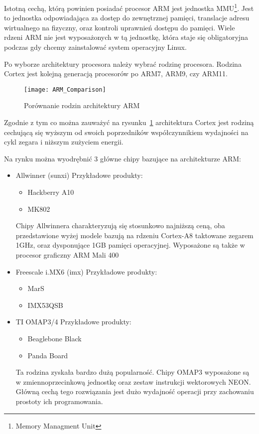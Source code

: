 \par
Istotną cechą, którą powinien posiadać procesor ARM jest jednostka MMU\footnote{Memory Managment Unit}. Jest to jednostka odpowiadająca za dostęp do zewnętrznej pamięci, translacje adresu wirtualnego na fizyczny, oraz kontroli uprawnień dostępu do pamięci. Wiele rdzeni ARM nie jest wyposażonych w tą jednostkę, która staje się obligatoryjna podczas gdy chcemy zainstalować system operacyjny Linux. 
\par

Po wyborze architektury procesora należy wybrać rodzinę procesora. Rodzina Cortex jest kolejną generacją procesorów po ARM7, ARM9, czy ARM11.

\begin{figure}
\begin{center}
	\texttt{[image: ARM\_Comparison]}
\end{center}
\caption{Porównanie rodzin architektury ARM}
\label{fig:ARM_Comp}
\end{figure}

Zgodnie z tym co można zauważyć na rysunku~\ref{fig:ARM_Comp} architektura Cortex jest rodziną cechującą się wyższym od swoich poprzedników współczynnikiem wydajności na cykl zegara i niższym zużyciem energii.

Na rynku można wyodrębnić 3 główne chipy bazujące na architekturze ARM:
\begin{itemize}
	\item Allwinner (sunxi)
	Przykładowe produkty:
	\begin{itemize}
		\item Hackberry A10
		\item MK802
	\end{itemize}

	Chipy Allwinnera charakteryzują się stosunkowo najniższą ceną, oba przedstawione wyżej modele bazują na rdzeniu Cortex-A8 taktowane zegarem 1GHz, oraz dysponujące 1GB pamięci operacyjnej. Wyposażone są także w procesor graficzny ARM Mali 400
	
	\item Freescale i.MX6 (imx)
	Przykładowe produkty:
	\begin{itemize}
		\item MarS
		\item IMX53QSB
	\end{itemize}
	\item TI OMAP3/4
	Przykładowe produkty:
		\begin{itemize}
			\item Beaglebone Black
			\item Panda Board
		\end{itemize}
	Ta rodzina zyskała bardzo dużą popularność. Chipy OMAP3 wyposażone są w zmiennoprzecinkową jednostkę oraz zestaw instrukcji wektorowych NEON. Główną cechą tego rozwiązania jest dużo wydajność operacji przy zachowaniu prostoty ich programowania.
\end{itemize}

